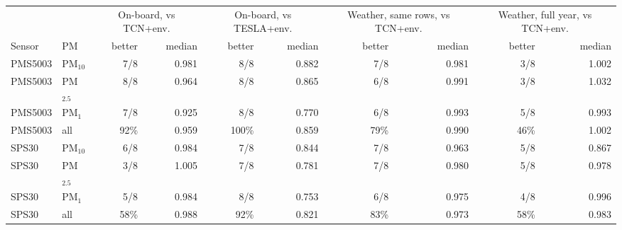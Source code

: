 \begin{tabular}{llrrrrrrrr}
\toprule
 & & \multicolumn{2}{c}{On-board, vs TCN+env.} & \multicolumn{2}{c}{On-board, vs TESLA+env.} & \multicolumn{2}{c}{Weather, same rows, vs TCN+env.} & \multicolumn{2}{c}{Weather, full year, vs TCN+env.} \\
Sensor & PM & better & median & better & median & better & median & better & median \\
\midrule
PMS5003 & PM$_{10}$ & 7/8 & 0.981 & 8/8 & 0.882 & 7/8 & 0.981 & 3/8 & 1.002 \\
PMS5003 & PM$_{2.5}$ & 8/8 & 0.964 & 8/8 & 0.865 & 6/8 & 0.991 & 3/8 & 1.032 \\
PMS5003 & PM$_{1}$ & 7/8 & 0.925 & 8/8 & 0.770 & 6/8 & 0.993 & 5/8 & 0.993 \\
PMS5003 & all & 92\% & 0.959 & 100\% & 0.859 & 79\% & 0.990 & 46\% & 1.002 \\
\midrule
SPS30 & PM$_{10}$ & 6/8 & 0.984 & 7/8 & 0.844 & 7/8 & 0.963 & 5/8 & 0.867 \\
SPS30 & PM$_{2.5}$ & 3/8 & 1.005 & 7/8 & 0.781 & 7/8 & 0.980 & 5/8 & 0.978 \\
SPS30 & PM$_{1}$ & 5/8 & 0.984 & 8/8 & 0.753 & 6/8 & 0.975 & 4/8 & 0.996 \\
SPS30 & all & 58\% & 0.988 & 92\% & 0.821 & 83\% & 0.973 & 58\% & 0.983 \\
\bottomrule
\end{tabular}
